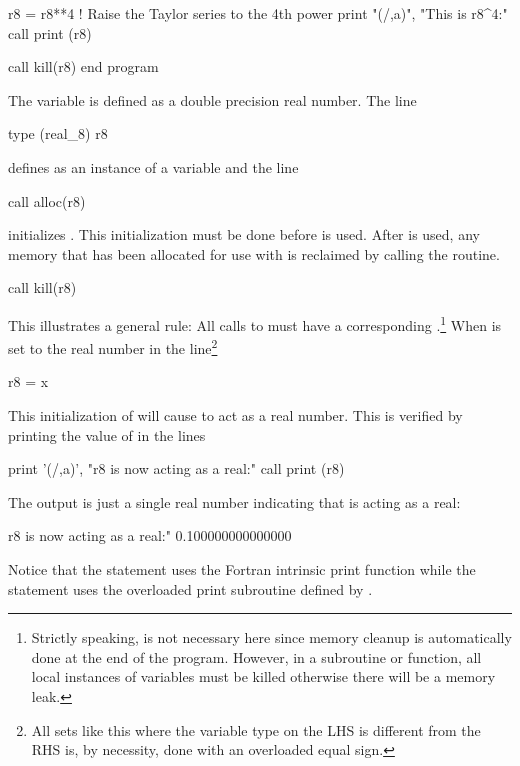 \documentclass{hitec}     %
\begin{document}
{\begin{code}
r8 = r8**4  ! Raise the Taylor series to the 4th power
print "(/,a)", "This is r8^4:"
call print (r8)

call kill(r8)
end program
\end{code}
The variable  is defined as a double precision real number. The line
\begin{code}
type (real_8) r8
\end{code}
defines  as an instance of a  variable and the line
\begin{code}
call alloc(r8)
\end{code}
initializes . This initialization must be done before  is used. After  is used,
any memory that has been allocated for use with  is reclaimed by calling the 
routine.
\begin{code}
call kill(r8)
\end{code}
This illustrates a general rule: All calls to  must have a corresponding .\footnote
  { 
Strictly speaking,  is not necessary here since memory cleanup is automatically done at the end
of the program. However, in a subroutine or function, all local instances of  variables
must be killed otherwise there will be a memory leak.
  }
When  is set to the real number  in the line\footnote
  {
All sets like this where the variable type on the LHS is different from the RHS is, by necessity, done
with an overloaded equal sign.
  }
\begin{code}
  r8 = x
\end{code}
This initialization of 
will cause  to act as a real number. This is verified by printing the value of  in the lines
\begin{code}
print '(/,a)', "r8 is now acting as a real:"
call print (r8)
\end{code}
The output is just a single real number indicating that  is acting as a real:
\begin{code}
r8 is now acting as a real:"
0.100000000000000
\end{code}
Notice that the  statement uses the Fortran intrinsic print function while the  statement uses the overloaded print subroutine defined by .

}
\end{document}
